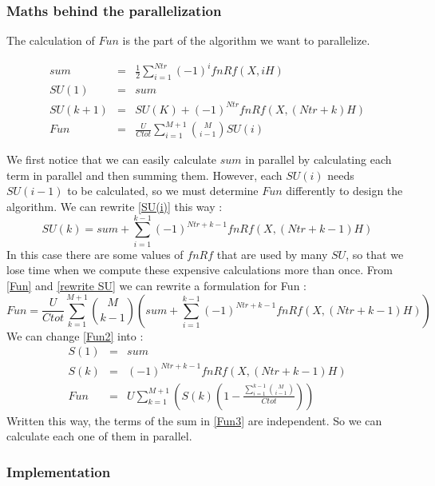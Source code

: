 \documentclass[11pt,a4paper]{article}
\begin{document}
\subsubsection*{Maths behind the parallelization}

The calculation of $Fun$ is the part of the algorithm we want to parallelize.

\begin{eqnarray}
	sum &=& \frac{1}{2}   \sum_{i=1}^{Ntr} (-1)^{i}fnRf(X,iH)\\
	SU(1) &=& sum  \\
	SU(k + 1) &=& SU(K) + (-1)^{Ntr}fnRf(X,(Ntr + k)H) \label{SU(i)}\\
	Fun &=&\frac{U}{Ctot} \sum_{i=1}^{M+1} \binom{M}{i-1}SU(i) \label{Fun}
\end{eqnarray}

We first notice that we can easily calculate $sum$ in parallel by calculating each term in parallel and then summing them. However, each $SU(i)$ needs $SU(i-1)$ to be calculated, so we must determine $Fun$ differently to design the algorithm.
We can rewrite \eqref{SU(i)} this way :
\begin{equation}
	SU(k) = sum + \sum_{i=1}^{k-1} (-1)^{Ntr+k-1}fnRf(X,(Ntr + k-1)H)
	\label{rewrite SU}
\end{equation}
In this case there are some values of $fnRf$ that are used by many $SU$, so that we lose time when we compute these expensive calculations more than once.
From \eqref{Fun} and \eqref{rewrite SU} we can rewrite a formulation for Fun :
\begin{equation}
	Fun =\displaystyle{ \frac{U}{Ctot}  \sum_{k=1}^{M+1} \binom{M}{k-1}\left(sum + \sum_{i=1}^{k-1} (-1)^{Ntr+k-1}fnRf(X,(Ntr + k-1)H)\right)}
	\label{Fun2}
\end{equation}
We can change \eqref{Fun2} into :
\begin{eqnarray}
	S(1) &=& sum\\
	S(k) &=& (-1)^{Ntr+k-1}fnRf(X,(Ntr + k-1)H)\\
	Fun &=& \displaystyle{U \sum_{k=1}^{M+1}\left(S(k)(1-\frac{ \sum_{i=1}^{k-1} \binom{M}{i-1}}{Ctot})\right)} \label{Fun3}
\end{eqnarray}
Written this way, the terms of the sum in \eqref{Fun3} are independent. So we can calculate each one of them in parallel.

\subsubsection*{Implementation}
\end{document}
